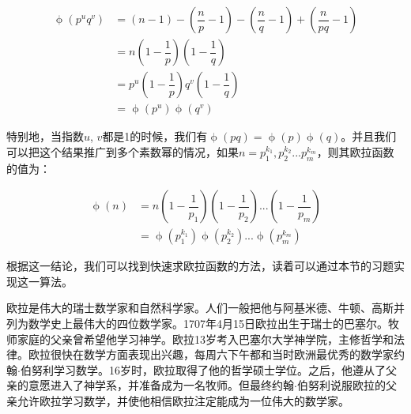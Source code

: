 \documentclass[b5paper]{ctexart}
\begin{document}
\begin{align*}
\upphi(p^uq^v) &=  (n - 1) - (\dfrac{n}{p} - 1) - (\dfrac{n}{q} - 1) + (\dfrac{n}{pq} - 1) \\
          &=  n(1 - \dfrac{1}{p})(1 - \dfrac{1}{q}) \\[5pt]
          &=  p^u(1 - \dfrac{1}{p})q^v(1 - \dfrac{1}{q}) \\[5pt]
          &=  \upphi(p^u)\upphi(q^v)
\end{align*}

特别地，当指数$u$, $v$都是1的时候，我们有$\upphi(pq) = \upphi(p)\upphi(q)$。并且我们可以把这个结果推广到多个素数幂的情况，如果$n = p_1^{k_1}, p_2^{k_2}...p_m^{k_m}$，则其欧拉函数的值为：

\begin{align*}
\upphi(n) &= n(1-\dfrac{1}{p_1})(1-\dfrac{1}{p_2})...(1-\dfrac{1}{p_m}) \\[5pt]
    &= \upphi(p_1^{k_1})\upphi(p_2^{k_2})...\upphi(p_m^{k_m})
\end{align*}

根据这一结论，我们可以找到快速求欧拉函数的方法，读着可以通过本节的习题实现这一算法。

\vspace{5mm}

欧拉是伟大的瑞士数学家和自然科学家。人们一般把他与阿基米德、牛顿、高斯并列为数学史上最伟大的四位数学家。1707年4月15日欧拉出生于瑞士的巴塞尔。牧师家庭的父亲曾希望他学习神学。欧拉13岁考入巴塞尔大学神学院，主修哲学和法律。欧拉很快在数学方面表现出兴趣，每周六下午都和当时欧洲最优秀的数学家约翰$\cdot$伯努利学习数学。16岁时，欧拉取得了他的哲学硕士学位。之后，他遵从了父亲的意愿进入了神学系，并准备成为一名牧师。但最终约翰$\cdot$伯努利说服欧拉的父亲允许欧拉学习数学，并使他相信欧拉注定能成为一位伟大的数学家。
\end{document}
